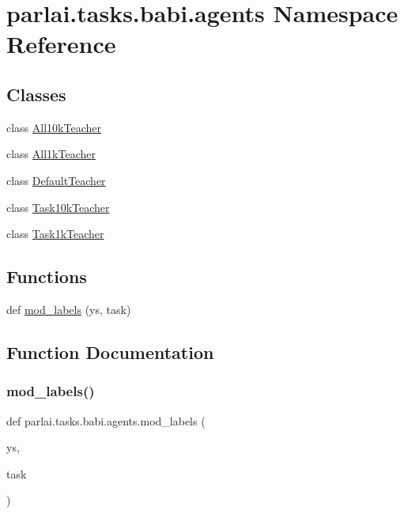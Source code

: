 \hypertarget{namespaceparlai_1_1tasks_1_1babi_1_1agents}{}\section{parlai.\+tasks.\+babi.\+agents Namespace Reference}
\label{namespaceparlai_1_1tasks_1_1babi_1_1agents}
\subsection*{Classes}
\begin{DoxyCompactItemize}
\item 
class \hyperlink{classparlai_1_1tasks_1_1babi_1_1agents_1_1All10kTeacher}{All10k\+Teacher}
\item 
class \hyperlink{classparlai_1_1tasks_1_1babi_1_1agents_1_1All1kTeacher}{All1k\+Teacher}
\item 
class \hyperlink{classparlai_1_1tasks_1_1babi_1_1agents_1_1DefaultTeacher}{Default\+Teacher}
\item 
class \hyperlink{classparlai_1_1tasks_1_1babi_1_1agents_1_1Task10kTeacher}{Task10k\+Teacher}
\item 
class \hyperlink{classparlai_1_1tasks_1_1babi_1_1agents_1_1Task1kTeacher}{Task1k\+Teacher}
\end{DoxyCompactItemize}
\subsection*{Functions}
\begin{DoxyCompactItemize}
\item 
def \hyperlink{namespaceparlai_1_1tasks_1_1babi_1_1agents_a80ee701751bc608fcb01bcfb1e884de0}{mod\+\_\+labels} (ys, task)
\end{DoxyCompactItemize}


\subsection{Function Documentation}
\mbox{\label{namespaceparlai_1_1tasks_1_1babi_1_1agents_a80ee701751bc608fcb01bcfb1e884de0}} 
\subsubsection{\texorpdfstring{mod\+\_\+labels()}{mod\_labels()}}
{\footnotesize\ttfamily def parlai.\+tasks.\+babi.\+agents.\+mod\+\_\+labels (\begin{DoxyParamCaption}\item[{}]{ys,  }\item[{}]{task }\end{DoxyParamCaption})}



